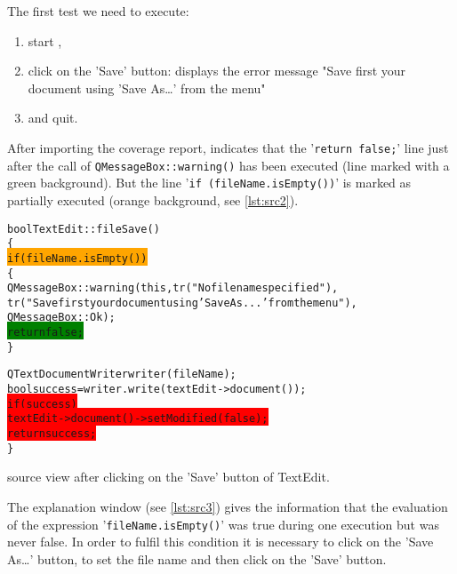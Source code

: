 The first test we need to execute:
\begin{enumerate}
  \item start {\TextEdit},
  \item click on the '\textsf{Save}' button: {\TextEdit} displays the error message "Save
    first your document using 'Save As\ldots' from the menu"
  \item and quit.
\end{enumerate}

After importing the coverage report, {\CoverageBrowser} indicates that the '\verb$return false;$'
line just after the call of \verb$QMessageBox::warning()$ has been executed (line
    marked with a green background). But the line '\verb$if (fileName.isEmpty())$' is
marked as partially executed (orange background, see \autoref{lst:src2}).

\begin{listings}[H]
  \scriptsize
\begin{alltt}
bool TextEdit::fileSave()
\{
\colorbox{orange}{  if (fileName.isEmpty())}
  \{
    QMessageBox::warning(this,tr("No file name specified"),
      tr("Save first your document using 'Save As...' from the menu"),
      QMessageBox::Ok );
\colorbox{green}{    return false;}
   \}

  QTextDocumentWriter writer(fileName);
  bool success = writer.write(textEdit->document());
\colorbox{red}{  if (success)}
\colorbox{red}{     textEdit->document()->setModified(false);}
\colorbox{red}{  return success;}
\}
\end{alltt}
\caption{{\CoverageBrowser} source view  after clicking on the 'Save' button of TextEdit.}
\label{lst:src2}
\end{listings}

The explanation window (see \autoref{lst:src3}) gives the information that the
evaluation of the expression '\verb$fileName.isEmpty()$' was true during one execution
but was never false. In order to fulfil this condition it is necessary to click
on  the '\textsf{Save As\ldots}' button,  to set the file name and then
click on the '\textsf{Save}' button.

